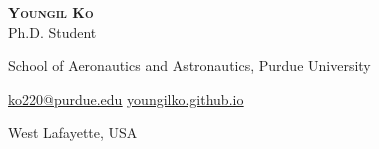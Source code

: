 \begin{center}
    \textbf{\Huge \scshape Youngil Ko} \\ \vspace{5pt}
    Ph.D. Student
    
    School of Aeronautics and Astronautics, Purdue University
    
    \href{mailto:ko220@purdue.edu}{ \underline{ko220@purdue.edu}} \quad
    \href{https://youngilko.github.io/}{ \underline{youngilko.github.io}}

    West Lafayette, USA
    
\end{center}